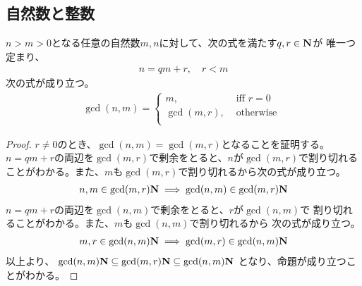 {\subsection{自然数と整数}\label{s2:自然数と整数} %
	\begin{proposition}[Euclidの互除法]\label{prop:Euclidの互除法} %
		$n>m>0$となる任意の自然数$m,n$に対して、次の式を満たす$q,r\in\mathbf{N}$が
		唯一つ定まり、
		\begin{equation*}\begin{split}
			n = qm + r,\quad r < m
		\end{split}\end{equation*}
		次の式が成り立つ。
		\begin{equation*}\begin{split}
			\gcd(n,m) = \begin{cases}
				m, &\text{ iff } r = 0 \\
				\gcd(m,r), &\text{ otherwise } \\
			\end{cases}
		\end{split}\end{equation*}
	\end{proposition} %
	\begin{proof} %
		$r\neq0$のとき、$\gcd(n,m)=\gcd(m,r)$となることを証明する。
		$n=qm+r$の両辺を$\gcd(m,r)$で剰余をとると、$n$が$\gcd(m,r)$で割り切れる
		ことがわかる。また、$m$も$\gcd(m,r)$で割り切れるから次の式が成り立つ。
		\begin{equation*}\begin{split}
			n,m\in \gcd(m,r)\mathbf{N} \implies \gcd(n,m)\in \gcd(m,r)\mathbf{N}
		\end{split}\end{equation*}
		$n=qm+r$の両辺を$\gcd(n,m)$で剰余をとると、$r$が$\gcd(n,m)$で
		割り切れることがわかる。また、$m$も$\gcd(n,m)$で割り切れるから
		次の式が成り立つ。
		\begin{equation*}\begin{split}
			m,r\in \gcd(n,m)\mathbf{N} \implies \gcd(m,r)\in \gcd(n,m)\mathbf{N}
		\end{split}\end{equation*}
		以上より、
		$\gcd(n,m)\mathbf{N}\subseteq\gcd(m,r)\mathbf{N}\subseteq\gcd(n,m)\mathbf{N}$
		となり、命題が成り立つことがわかる。
	\end{proof} %

}
